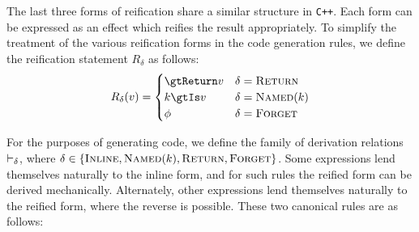 \documentclass{article}
\begin{document}
    The last three forms of reification share a similar structure in \texttt{C++}. Each form can be
    expressed as an effect which reifies the result appropriately. To simplify the treatment of the
    various reification forms in the code generation rules, we define the reification statement
    $R_\delta$ as follows:
%
    \begin{align*}
        R_\delta(v) = \begin{cases}
            \gtReturn v & \delta = \textsc{Return} \\
            k \gtIs v & \delta = \textsc{Named$(k)$} \\
            \phi & \delta = \textsc{Forget}
        \end{cases}
    \end{align*}

    For the purposes of generating code, we define the family of derivation relations $\rwD$, where
    $\delta \in \{\textsc{Inline}, \textsc{Named$(k)$}, \textsc{Return}, \textsc{Forget}\}$. Some
    expressions lend themselves naturally to the inline form, and for such rules the reified form
    can be derived mechanically. Alternately, other expressions lend themselves naturally to the
    reified form, where the reverse is possible. These two canonical rules are as follows:
%
    \begin{mathpar}

    \end{mathpar}
\end{document}

